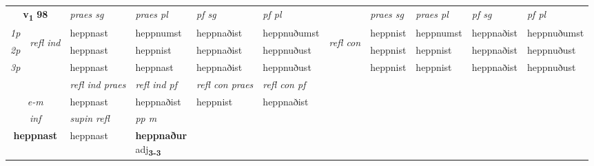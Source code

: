 \noindent
\begin{tabular}{lllllllllll} \toprule
\multicolumn{2}{c}{\textbf{v{\textsubscript{1}}} \Large{\textbf{98}}}  &  \textit{praes sg}  & \textit{praes pl}  &\textit{ pf sg} & \textit{pf pl} &  &  \textit{praes sg}  & \textit{praes pl}  & \textit{pf sg} & \textit{pf pl } \\*
	\cmidrule{3-6} \cmidrule{8-11}
 {\textit{1p}} & \multirow{3}{*}{\begin{turn}{90}\textit{refl ind}\end{turn}}  & heppnast & heppnumst & heppnaðist & heppnuðumst & \multirow{3}{*}{\begin{turn}{90}\textit{refl con}\end{turn}}  &heppnist & heppnumst & heppnaðist & heppnuðumst \\*
 {\textit{2p}} &  & heppnast & heppnist & heppnaðist & heppnuðust & &heppnist & heppnist & heppnaðist & heppnuðust \\*
 {\textit{3p}}  & & heppnast & heppnast & heppnaðist & heppnuðust & & heppnist & heppnist& heppnaðist & heppnuðust \\*
\cmidrule{3-6} \cmidrule{8-11}

 & & \textit{refl ind praes} & \textit{refl ind pf} & \textit{refl con praes} & \textit{refl con pf} \\*
 \multicolumn{2}{c}{ \textit{e-m} }& heppnast & heppnaðist & heppnist & heppnaðist \\*

\cmidrule{3-4}
   \multicolumn{2}{c}{\textit{inf}}       & \textit{supin refl} & \textit{pp m} \\*
  \multicolumn{2}{c}{\textbf{heppnast}}        & heppnast & \specialcell{\textbf{heppnaður} \\ adj\textbf{\textsubscript{3-3}}} \\*
\end{tabular}

